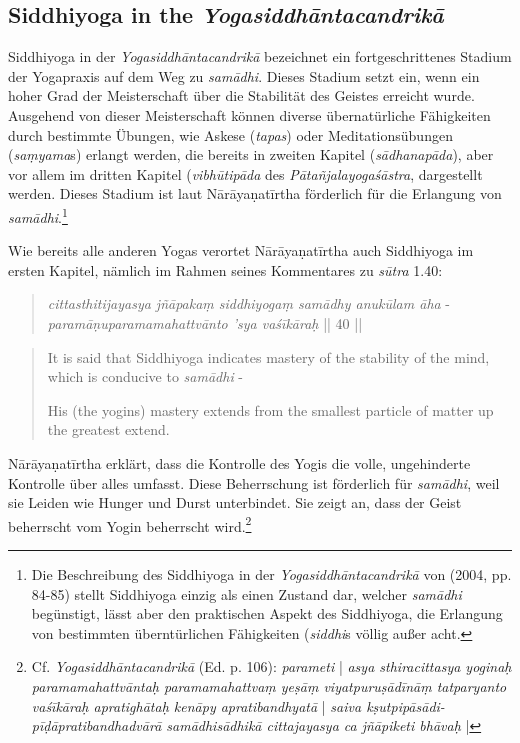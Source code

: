 \subsection{Siddhiyoga in the \textit{Yogasiddhāntacandrikā}}

Siddhiyoga in der \textit{Yogasiddhāntacandrikā} bezeichnet ein fortgeschrittenes Stadium der Yogapraxis auf dem Weg zu \textit{samādhi}. Dieses Stadium setzt ein, wenn ein hoher Grad der Meisterschaft über die Stabilität des Geistes erreicht wurde. Ausgehend von dieser Meisterschaft können diverse übernatürliche Fähigkeiten durch bestimmte Übungen, wie Askese (\textit{tapas}) oder Meditationsübungen (\textit{saṃyama}s) erlangt werden, die bereits in zweiten Kapitel (\textit{sādhanapāda}), aber vor allem im dritten Kapitel (\textit{vibhūtipāda} des \textit{Pātañjalayogaśāstra}, dargestellt werden. Dieses Stadium ist laut Nārāyaṇatīrtha förderlich für die Erlangung von \textit{samādhi}.\footnote{Die Beschreibung des Siddhiyoga in der \textit{Yogasiddhāntacandrikā} von \citeauthor{penna2004} (2004, pp. 84-85) stellt Siddhiyoga einzig als einen Zustand dar, welcher \textit{samādhi} begünstigt, lässt aber den praktischen Aspekt des Siddhiyoga, die Erlangung von bestimmten überntürlichen Fähigkeiten (\textit{siddhi}s völlig außer acht.}    

Wie bereits alle anderen Yogas verortet Nārāyaṇatīrtha auch Siddhiyoga im ersten Kapitel, nämlich im Rahmen seines Kommentares zu \textit{sūtra} 1.40:

\begin{quote}
  \textit{cittasthitijayasya jñāpakaṃ siddhiyogaṃ samādhy anukūlam āha} -\\
\textit{paramāṇuparamamahattvānto 'sya vaśīkāraḥ} || 40 ||
\end{quote}
\begin{quote}
It is said that Siddhiyoga indicates mastery of the stability of the mind, which is conducive to \textit{samādhi} -

His (the yogins) mastery extends from the smallest particle of matter up the greatest extend. \end{quote}

Nārāyaṇatīrtha erklärt, dass die Kontrolle des Yogis die volle, ungehinderte Kontrolle über alles umfasst. Diese Beherrschung ist förderlich für \textit{samādhi}, weil sie Leiden wie Hunger und Durst unterbindet. Sie zeigt an, dass der Geist beherrscht vom Yogin beherrscht wird.\footnote{Cf. \textit{Yogasiddhāntacandrikā} (Ed. p. 106): \textit{parameti} | \textit{asya sthiracittasya yoginaḥ paramamahattvāntaḥ paramamahattvaṃ yeṣāṃ viyatpuruṣādīnāṃ tatparyanto vaśīkāraḥ apratighātaḥ kenāpy apratibandhyatā} | \textit{saiva kṣutpipāsādi- pīḍāpratibandhadvārā samādhisādhikā cittajayasya ca jñāpiketi bhāvaḥ} |}

